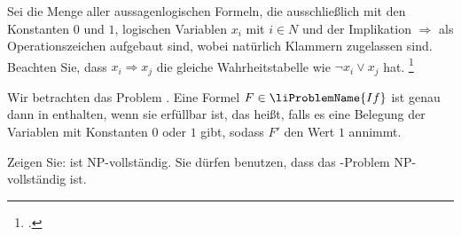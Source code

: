 \documentclass{lehramt-informatik-aufgabe}
\begin{document}

Sei  die Menge aller aussagenlogischen Formeln, die
ausschließlich mit den Konstanten $0$ und $1$, logischen Variablen $x_i$
mit $i \in N$ und der Implikation $\Rightarrow$ als Operationszeichen
aufgebaut sind, wobei natürlich Klammern zugelassen sind. Beachten Sie,
dass $x_i \Rightarrow x_j$ die gleiche Wahrheitstabelle wie $\neg x_i
\lor x_j$ hat.
\footcite{examen:66115:2020:09}

Wir betrachten das Problem . Eine Formel $F \in
\liProblemName{If}$ ist genau dann in  enthalten,
wenn sie erfüllbar ist, das heißt, falls es eine Belegung der Variablen
mit Konstanten $0$ oder $1$ gibt, sodass $F'$ den Wert $1$ annimmt.

Zeigen Sie:  ist NP-vollständig. Sie dürfen
benutzen, dass das -Problem NP-vollständig ist.

\begin{liAntwort}

\end{liAntwort}
\end{document}
